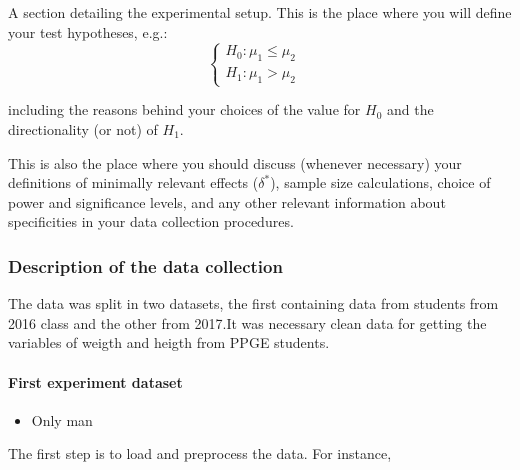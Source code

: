 \documentclass[
]{article}
\providecommand{\tightlist}{%
  \setlength{\itemsep}{0pt}\setlength{\parskip}{0pt}}
\begin{document}
A section detailing the experimental setup. This is the place where you
will define your test hypotheses, e.g.:
\[\begin{cases} H_0: \mu_1 \leq \mu_2&\\H_1: \mu_1 > \mu_2\end{cases}\]

including the reasons behind your choices of the value for \(H_0\) and
the directionality (or not) of \(H_1\).

This is also the place where you should discuss (whenever necessary)
your definitions of minimally relevant effects (\(\delta^*\)), sample
size calculations, choice of power and significance levels, and any
other relevant information about specificities in your data collection
procedures.

\hypertarget{description-of-the-data-collection}{%
\subsubsection{Description of the data
collection}\label{description-of-the-data-collection}}

The data was split in two datasets, the first containing data from
students from 2016 class and the other from 2017.It was necessary clean
data for getting the variables of weigth and heigth from PPGE students.

\hypertarget{first-experiment-dataset}{%
\paragraph{First experiment dataset}\label{first-experiment-dataset}}

\begin{itemize}
\tightlist
\item
  Only man
\end{itemize}

The first step is to load and preprocess the data. For instance,
\end{document}
